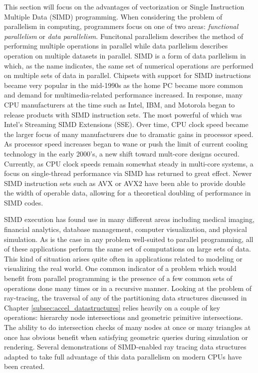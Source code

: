 \documentclass[12pt, a4paper]{article}
\begin{document}
This section will focus on the advantages of vectorization or Single Instruction Multiple Data (SIMD) programming. When considering the problem of parallelism in computing, programmers focus on one of two areas: \textit{functional parallelism} or \textit{data parallelism}. Funcitonal parallelism describes the method of performing multiple operations in parallel while data parllelism describes operation on multiple datasets in parallel. SIMD is a form of data parllelism in which, as the name indicates, the same set of numerical operations are performed on multiple sets of data in parallel. Chipsets with support for SIMD instructions became very popular in the mid-1990s as the home PC became more common and demand for multimedia-related performance increased. In response, many CPU manufacturers at the time such as Intel, IBM, and Motorola began to release products with SIMD instruction sets. The most powerful of which was Intel's Streaming SIMD Extensions (SSE). Over time, CPU clock speed became the larger focus of many manufacturers due to dramatic gains in processor speed. As processor speed increases began to wane or push the limit of current cooling technology in the early 2000's, a new shift toward mult-core designs occured. Currently, as CPU clock speeds remain somewhat steady in multi-core systems, a focus on single-thread performance via SIMD has returned to great effect. Newer SIMD instruction sets such as AVX or AVX2 have been able to provide double the width of operable data, allowing for a theoretical doubling of performance in SIMD codes. \cite{Single_Instruction_Multiple_Data_Execution}

SIMD execution has found use in many different areas including medical imaging, financial analytics, database management, computer visualization, and physical simulation. As is the case in any problem well-suited to parallel programming, all of these applications perform the same set of computations on large sets of data. This kind of situation arises quite often in applications related to modeling or visualizing the real world. One common indicator of a problem which would benefit from parallel programming is the presence of a few common sets of operations done many times or in a recursive manner. Looking at the problem of ray-tracing, the traversal of any of the partitioning data structures discussed in Chapter \ref{subsec:accel_datastructures} relies heavily on a couple of key operations: hierarchy node intersections and geometric primitive intersections. The ability to do intersection checks of many nodes at once or many triangles at once has obvious benefit when satisfying geometric queries during simulation or rendering. Several demonstrations of SIMD-enabled ray tracing data structures adapted to take full advantage of this data parallelism on modern CPUs have been created.
\end{document}
